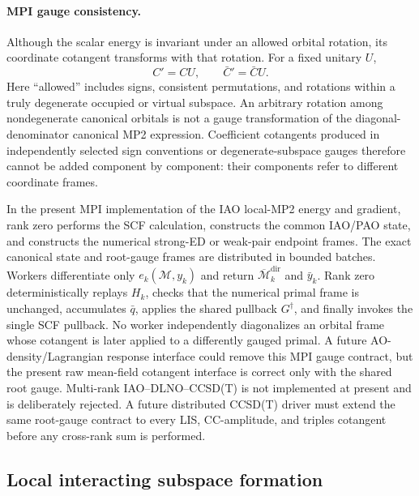 \documentclass[11pt]{article}
\begin{document}
\paragraph{MPI gauge consistency.}
Although the scalar energy is invariant under an allowed orbital rotation,
its coordinate cotangent transforms with that rotation.  For a fixed unitary
$U$,
\begin{equation}
 C'=CU,\qquad \bar C'=\bar C U.
 \label{eq:orbital-cotangent-gauge}
\end{equation}
Here ``allowed'' includes signs, consistent permutations, and rotations within
a truly degenerate occupied or virtual subspace.  An arbitrary rotation among
nondegenerate canonical orbitals is not a gauge transformation of the
diagonal-denominator canonical MP2 expression.
Coefficient cotangents produced in independently selected sign conventions
or degenerate-subspace gauges therefore cannot be added component by
component: their components refer to different coordinate frames.

In the present MPI implementation of the IAO local-MP2 energy and gradient,
rank zero performs the SCF calculation, constructs the common IAO/PAO state,
and constructs the numerical strong-ED or weak-pair endpoint frames.  The
exact canonical state and root-gauge frames are distributed in bounded
batches.  Workers differentiate only
$e_k(\mathcal M,y_k)$ and return
$\overline{\mathcal M}^{\mathrm{dir}}_k$ and $\bar y_k$.  Rank zero
deterministically replays $H_k$, checks that the numerical primal frame is
unchanged, accumulates $\bar q$, applies the shared pullback $G^\dagger$, and
finally invokes the single SCF pullback.  No worker independently
diagonalizes an orbital frame whose cotangent is later applied to a
differently gauged primal.  A future AO-density/Lagrangian response interface
could remove this MPI gauge contract, but the present raw mean-field
cotangent interface is correct only with the shared root gauge.  Multi-rank
IAO--DLNO--CCSD(T) is not implemented at present and is deliberately
rejected.  A future distributed CCSD(T) driver must extend the same root-gauge
contract to every LIS, CC-amplitude, and triples cotangent before any
cross-rank sum is performed.

\subsection{Local interacting subspace formation}
\end{document}
